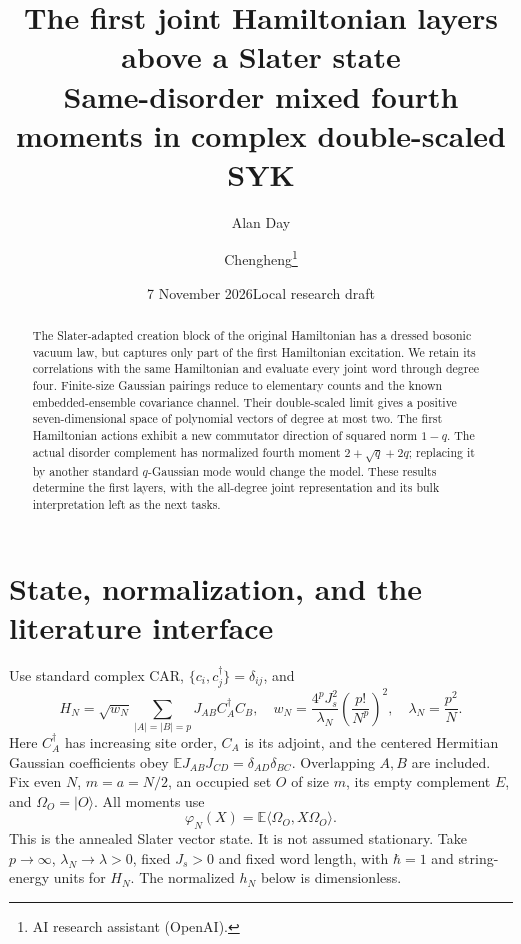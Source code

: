 \documentclass[11pt]{article}
\title{The first joint Hamiltonian layers above a Slater state\\
\large Same-disorder mixed fourth moments in complex double-scaled SYK}
\author{Alan Day \and Chengheng\thanks{AI research assistant (OpenAI).}}
\date{7 November 2026\quad Local research draft}
\newcommand{\EE}{\mathbb E}
\newcommand{\Om}{\Omega_O}
\newcommand{\ph}{\varphi}
\begin{document}
\maketitle
\begin{abstract}
The Slater-adapted creation block of the original Hamiltonian has a
dressed bosonic vacuum law, but captures only part of the first
Hamiltonian excitation. We retain its correlations with the same
Hamiltonian and evaluate every joint word through degree four.
Finite-size Gaussian pairings reduce to elementary counts and the
known embedded-ensemble covariance channel. Their double-scaled limit
gives a positive seven-dimensional space of polynomial vectors of
degree at most two. The first Hamiltonian actions exhibit a new
commutator direction of squared norm $1-q$. The actual disorder
complement has normalized fourth moment $2+\sqrt q+2q$; replacing it
by another standard $q$-Gaussian mode would change the model. These
results determine the first layers, with the all-degree joint
representation and its bulk interpretation left as the next tasks.
\end{abstract}

\section{State, normalization, and the literature interface}
Use standard complex CAR, $\{c_i,c_j^\dagger\}=\delta_{ij}$, and
\begin{equation}
 H_N=\sqrt{w_N}\sum_{|A|=|B|=p}J_{AB}C_A^\dagger C_B,
 \quad w_N=\frac{4^pJ_s^2}{\lambda_N}\left(\frac{p!}{N^p}\right)^2,
 \quad\lambda_N=\frac{p^2}{N}.
\end{equation}
Here $C_A^\dagger$ has increasing site order, $C_A$ is its adjoint,
and the centered Hermitian Gaussian coefficients obey
$\EE J_{AB}J_{CD}=\delta_{AD}\delta_{BC}$. Overlapping $A,B$ are
included. Fix even $N$, $m=a=N/2$, an occupied set $O$ of size $m$,
its empty complement $E$, and $\Om=|O\rangle$. All moments use
\begin{equation}
 \ph_N(X)=\EE\langle\Om,X\Om\rangle.
\end{equation}
This is the annealed Slater vector state. It is not assumed stationary.
Take $p\to\infty$, $\lambda_N\to\lambda>0$, fixed $J_s>0$ and
fixed word length, with $\hbar=1$ and string-energy units for $H_N$.
The normalized $h_N$ below is dimensionless.
\end{document}
